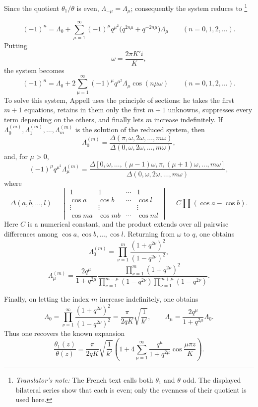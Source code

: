 \documentclass[
  paper=b5,
  fontsize=13pt,
  twoside=true,
  open=any,
  bookmarkpackage=false,
  chapterprefix=true,
  headings=normal
]{scrbook}
\theoremstyle{definition}
\newcounter{translatornote}
\newcommand{\translatornotelabel}{T\arabic{translatornote}}
\newcommand{\translatornote}[1]{%
  \stepcounter{translatornote}%
  \begingroup
    \edef\savedfootnotenumber{\number\value{footnote}}%
    \renewcommand{\thefootnote}{\translatornotelabel}%
    \footnote{\emph{Translator's note:} #1}%
    \setcounter{footnote}{\savedfootnotenumber}%
  \endgroup
}
\begin{document}
Since the quotient $\theta_1/\theta$ is even, $\Lambda_{-\mu}=\Lambda_\mu$; consequently the system reduces to\translatornote{The French text calls both $\theta_1$ and $\theta$ odd.  The displayed bilateral series show that each is even; only the evenness of their quotient is used here.}
\[
 (-1)^n=\Lambda_0+
 \sum_{\mu=1}^{\infty}(-1)^\mu q^{\mu^2}
       \bigl(q^{2n\mu}+q^{-2n\mu}\bigr)\Lambda_\mu
 \qquad(n=0,1,2,\ldots).
\]
Putting
\[
  \omega=\frac{2\pi K'i}{K},
\]
the system becomes
\[
 (-1)^n=\Lambda_0+2\sum_{\mu=1}^{\infty}
 (-1)^\mu q^{\mu^2}\Lambda_\mu\cos(n\mu\omega)
 \qquad(n=0,1,2,\ldots).
\]
To solve this system, Appell uses the principle of sections: he takes the first $m+1$ equations, retains in them only the first $m+1$ unknowns, suppresses every term depending on the others, and finally lets $m$ increase indefinitely. If $\Lambda_0^{(m)},\Lambda_1^{(m)},\ldots,\Lambda_m^{(m)}$ is the solution of the reduced system, then
\[
 \Lambda_0^{(m)}=\frac{\Delta(\pi,\omega,2\omega,\ldots,m\omega)}
                       {\Delta(0,\omega,2\omega,\ldots,m\omega)},
\]
and, for $\mu>0$,
\[
 (-1)^\mu q^{\mu^2}\Lambda_\mu^{(m)}
 =\frac{\Delta[0,\omega,\ldots,(\mu-1)\omega,\pi,
        (\mu+1)\omega,\ldots,m\omega]}
       {\Delta(0,\omega,2\omega,\ldots,m\omega)},
\]
where
\[
 \Delta(a,b,\ldots,l)=
 \begin{vmatrix}
 1&1&\cdots&1\\
 \cos a&\cos b&\cdots&\cos l\\
 \vdots&\vdots&&\vdots\\
 \cos ma&\cos mb&\cdots&\cos ml
 \end{vmatrix}
 =C\prod(\cos a-\cos b).
\]
Here $C$ is a numerical constant, and the product extends over all pairwise differences among $\cos a,\cos b,\ldots,\cos l$. Returning from $\omega$ to $q$, one obtains
\[
 \Lambda_0^{(m)}=\prod_{\nu=1}^{m}
       \frac{(1+q^{2\nu})^2}{(1-q^{2\nu})^2},
\]
\[
 \Lambda_\mu^{(m)}=\frac{2q^\mu}{1+q^{2\mu}}
 \frac{\displaystyle\prod_{\nu=1}^{m}(1+q^{2\nu})^2}
      {\displaystyle
       \prod_{\nu=1}^{m-\mu}(1-q^{2\nu})
       \prod_{\nu=1}^{m+\mu}(1-q^{2\nu})}.
\]

Finally, on letting the index $m$ increase indefinitely, one obtains
\[
 \Lambda_0=\prod_{\nu=1}^{\infty}
 \frac{(1+q^{2\nu})^2}{(1-q^{2\nu})^2}
 =\frac{\pi}{2qK}\sqrt{\frac1{k'}},
 \qquad
 \Lambda_\mu=\frac{2q^\mu}{1+q^{2\mu}}\Lambda_0.
\]
Thus one recovers the known expansion
\[
 \frac{\theta_1(z)}{\theta(z)}
 =\frac{\pi}{2qK}\sqrt{\frac1{k'}}
 \left(1+4\sum_{\mu=1}^{\infty}
 \frac{q^\mu}{1+q^{2\mu}}\cos\frac{\mu\pi z}{K}\right).
\]
\end{document}
